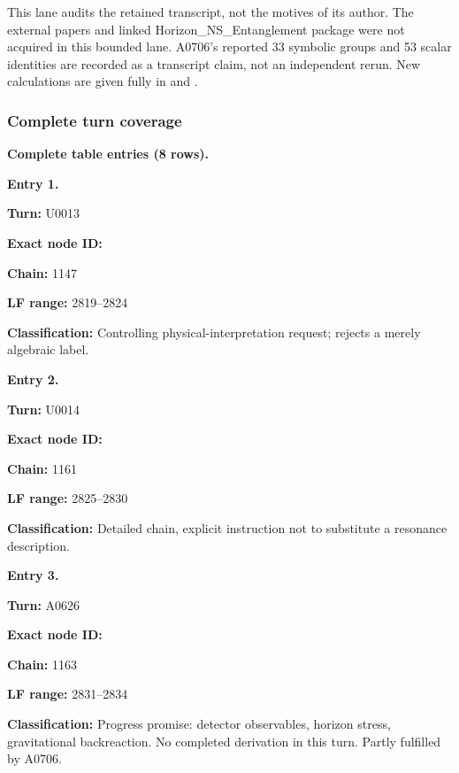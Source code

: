 This lane audits the retained transcript, not the motives of its author.
The external papers and linked Horizon\_NS\_Entanglement package were
not acquired in this bounded lane. A0706's reported 33 symbolic groups
and 53 scalar identities are recorded as a transcript claim, not an
independent rerun. New calculations are given fully in
\protect{} and \protect{}.

\subsubsection{Complete turn coverage}\label{TranscriptLedgerStage:complete-turn-coverage-1}

\textbf{Complete table entries (8 rows).}


\textbf{Entry 1.}

\textbf{Turn:} U0013

\textbf{Exact node ID:}
\protect{}

\textbf{Chain:} 1147

\textbf{LF range:} 2819--2824

\textbf{Classification:} Controlling physical-interpretation request;
rejects a merely algebraic label.


\textbf{Entry 2.}

\textbf{Turn:} U0014

\textbf{Exact node ID:}
\protect{}

\textbf{Chain:} 1161

\textbf{LF range:} 2825--2830

\textbf{Classification:} Detailed
\protect{} chain, explicit
instruction not to substitute a resonance description.


\textbf{Entry 3.}

\textbf{Turn:} A0626

\textbf{Exact node ID:}
\protect{}

\textbf{Chain:} 1163

\textbf{LF range:} 2831--2834

\textbf{Classification:} Progress promise: detector observables, horizon
stress, gravitational backreaction. No completed derivation in this
turn. Partly fulfilled by A0706.

